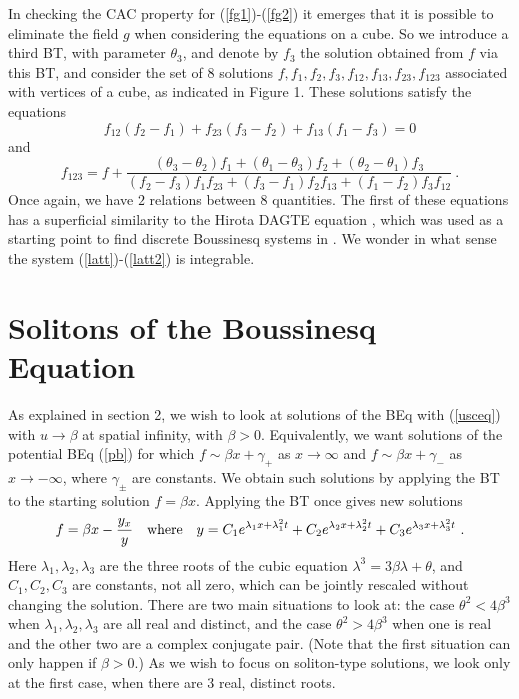\documentclass[12pt]{article}
\begin{document}
In checking the CAC property for (\ref{fg1})-(\ref{fg2}) it emerges that it is possible to eliminate
the field $g$ when considering the equations on a cube. So we introduce a third BT, with parameter
$\theta_3$, and denote by $f_3$ the solution obtained from $f$ via this BT, and consider the
set of $8$ solutions $f,f_1,f_2,f_3,f_{12},f_{13},f_{23},f_{123}$ associated with vertices of a cube, as
indicated in Figure 1. These solutions satisfy the equations 
\begin{equation} 
    f_{12} (f_2-f_1)  
  + f_{23} (f_3-f_2)  
  + f_{13} (f_1-f_3)  = 0   \label{latt}
\end{equation}
and
\begin{equation}
f_{123} = f + \frac{(\theta_3-\theta_2)f_1+(\theta_1-\theta_3)f_2+(\theta_2-\theta_1)f_3}
{  (f_2-f_3)f_1f_{23}   +(f_3-f_1)f_2f_{13}   +(f_1-f_2)f_3f_{12}}\ . 
\label{latt2}
\end{equation}
Once again, we have $2$ relations between $8$ quantities. 
The first of these equations has a superficial similarity to the Hirota DAGTE equation \cite{beq29},
which was used as a starting point to find discrete Boussinesq systems in \cite{beq24}. We wonder in what sense 
the system (\ref{latt})-(\ref{latt2}) is integrable.

\section{Solitons of the Boussinesq Equation} 

As explained in section 2, we wish to look at solutions of the BEq with (\ref{usceq}) with $u\rightarrow\beta$
at spatial infinity, with $\beta>0$. Equivalently, we want solutions of the potential BEq (\ref{pb}) for
which $f\sim\beta x + \gamma_+$ as $x\rightarrow\infty$
and $f\sim\beta x + \gamma_-$ as $x\rightarrow-\infty$, where $\gamma_{\pm}$ are constants. We
obtain such solutions by applying the BT to the starting solution $f = \beta x$. 
Applying the BT once gives new solutions
\begin{equation}
  f  =  \beta x - \frac{y_x}{y} \quad {\rm where} \quad 
y  =  C_1 e^{\lambda_1 x + \lambda_1^2 t} + C_2 e^{\lambda_2 x + \lambda_2^2 t} + C_3 e^{\lambda_3 x + \lambda_3^2 t}\ .
\label{yeq}
\end{equation} 
Here
$\lambda_1,\lambda_2,\lambda_3$ are the three roots of the cubic equation $\lambda^3 = 3 \beta \lambda + \theta$,
and
$C_1,C_2,C_3$ are constants, not all zero, which can be jointly rescaled without changing the solution. There are two
main situations to look at: the case $\theta^2<4\beta^3$ when $\lambda_1,\lambda_2,\lambda_3$ are all real and distinct,
and  the case  $\theta^2>4\beta^3$ when one is real and the other two are a complex conjugate pair. (Note
that the first situation can only happen if $\beta>0$.) As we wish to focus on soliton-type solutions, we look
only at the first case, when there are $3$ real, distinct roots. 
\end{document}
